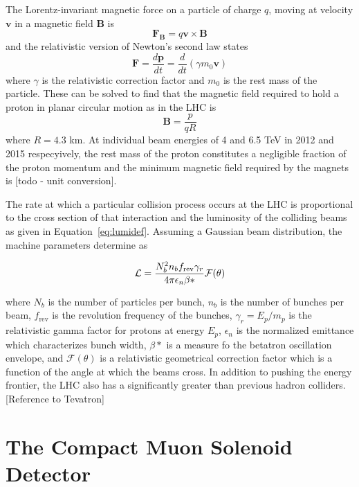 The Lorentz-invariant magnetic force on a
  particle of charge $q$, moving at
  velocity $\mathbf{v}$ in a 
  magnetic field $\mathbf{B}$ is
\begin{equation}\label{eq:bforce}
 \mathbf{F_B}=q\mathbf{v}\times\mathbf{B}
\end{equation}
 and the relativistic version of Newton's second
 law states
\begin{equation}
 \mathbf{F} = \frac{d\mathbf{p}}{dt} =
  \frac{d}{dt}\left ( \gamma m_0 \mathbf{v}  \right )
\end{equation}
 where $\gamma$ is the relativistic correction
 factor and $m_0$ is the rest mass of the particle.
These can be solved to find that the magnetic field
 required to hold a proton in planar
 circular motion as in the LHC is
\begin{equation}
 \mathbf{B}=\frac{p}{qR}
\end{equation}
 where $R = 4.3$ km.
At individual beam energies of 4 and 6.5 TeV
 in 2012 and 2015 respecyively,
 the rest mass of the proton constitutes
 a negligible fraction of the proton momentum
 and the minimum magnetic field required by the
 magnets is [todo - unit conversion].

The rate at which a particular collision 
 process occurs
 at the LHC is proportional to 
 the cross section of that interaction
 and the luminosity of the colliding beams
 as given in Equation~\ref{eq:lumidef}.
Assuming a Gaussian beam distribution,
 the machine parameters determine \lumi as

\begin{equation}\label{eq:lumi}
 \mathcal L=\frac{N_b^2 n_b f_{\mathrm{rev}} \gamma_r}{4\pi\epsilon_n \beta*}\mathcal{F}(\theta)
\end{equation}

 where $N_b$ is the number of particles per bunch,
 $n_b$ is the number of bunches per beam,
 $f_{\mathrm{rev}}$ is the revolution frequency of the bunches,
 $\gamma_r=E_p/m_p$ is the relativistic gamma factor
  for protons at energy $E_p$,
 $\epsilon_n$ is the normalized emittance which 
  characterizes bunch width,
 $\beta*$ is a measure fo the betatron oscillation envelope,
 and $\mathcal{F}(\theta)$ is a relativistic geometrical 
 correction factor which is a function of the
 angle at which the beams cross.
In addition to pushing the energy frontier,
 the LHC also has a significantly greater
 \lumi than previous hadron colliders. 
[Reference to Tevatron]
 
\section{The Compact Muon Solenoid Detector}

